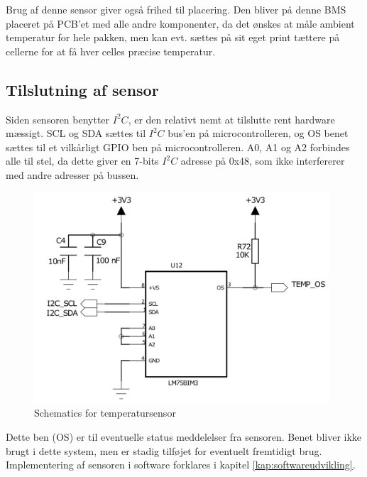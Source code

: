 Brug af denne sensor giver også frihed til placering. Den bliver på denne BMS placeret på PCB'et med alle andre komponenter, da det ønskes at måle ambient temperatur for hele pakken, men kan evt. sættes på sit eget print tættere på cellerne for at få hver celles præcise temperatur. 

\subsection{Tilslutning af sensor}
Siden sensoren benytter $I^2C$, er den relativt nemt at tilslutte rent hardware mæssigt. SCL og SDA sættes til $I^2C$ bus'en på microcontrolleren, og OS benet sættes til et vilkårligt GPIO ben på microcontrolleren. A0, A1 og A2 forbindes alle til stel, da dette giver en 7-bits $I^2C$ adresse på 0x48, som ikke interfererer med andre adresser på bussen. \\

\begin{figure}[h]
	\centering
	\includegraphics[width=11cm]{billeder/temp_sensor_sch.png}
	\caption{Schematics for temperatursensor}
	\label{fig:temp_sensor}
\end{figure}

Dette ben (OS) er til eventuelle status meddelelser fra sensoren. Benet bliver ikke brugt i dette system, men er stadig tilføjet for eventuelt fremtidigt brug. Implementering af sensoren i software forklares i kapitel \ref{kap:softwareudvikling}.